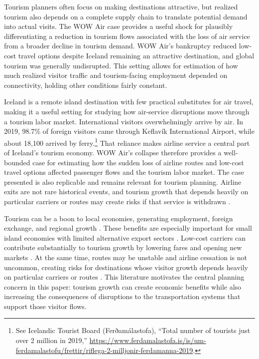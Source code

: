 \documentclass[12pt]{article}
\begin{document}
Tourism planners often focus on making destinations attractive, but realized tourism also depends on a complete supply chain to translate potential demand into actual visits. The WOW Air case provides a useful shock for plausibly differentiating a reduction in tourism flows associated with the loss of air service from a broader decline in tourism demand. WOW Air's bankruptcy reduced low-cost travel options despite Iceland remaining an attractive destination, and global tourism was generally undisrupted. This setting allows for estimation of how much realized visitor traffic and tourism-facing employment depended on connectivity, holding other conditions fairly constant.


Iceland is a remote island destination with few practical substitutes for air travel, making it a useful setting for studying how air-service disruptions move through a tourism labor market. International visitors overwhelmingly arrive by air. In 2019, 98.7\% of foreign visitors came through Keflavík International Airport, while about 18,100 arrived by ferry.\footnote{See Icelandic Tourist Board (Ferðamálastofa), ``Total number of tourists just over 2 million in 2019,'' \url{https://www.ferdamalastofa.is/is/um-ferdamalastofu/frettir/riflega-2-milljonir-ferdamanna-2019}.} That reliance makes airline service a central part of Iceland's tourism economy. WOW Air's collapse therefore provides a well-bounded case for estimating how the sudden loss of airline routes and low-cost travel options affected passenger flows and the tourism labor market. The case presented is also replicable and remains relevant for tourism planning. Airline exits are not rare historical events, and tourism growth that depends heavily on particular carriers or routes may create risks if that service is withdrawn \citep{bachwich_wittman_2017_ulcc,sun_zheng_wang_wandelt_2025_cessation}.

Tourism can be a boon to local economies, generating employment, foreign exchange, and regional growth \citep{gwenhure_2017_tourism,seetanah_2011_assessing,faber_2019_tourism}. These benefits are especially important for small island economies with limited alternative export sectors \citep{seetanah_2011_assessing,roudi_2018_new,kumar_2021_tourism}. Low-cost carriers can contribute substantially to tourism growth by lowering fares and opening new markets \citep{pulina_2010_have,chung_2011_korean,hongtsui_2017_does}. At the same time, routes may be unstable and airline cessation is not uncommon, creating risks for destinations whose visitor growth depends heavily on particular carriers or routes \citep{bachwich_wittman_2017_ulcc,sun_zheng_wang_wandelt_2025_cessation}. This literature motivates the central planning concern in this paper: tourism growth can create economic benefits while also increasing the consequences of disruptions to the transportation systems that support those visitor flows.
\end{document}
